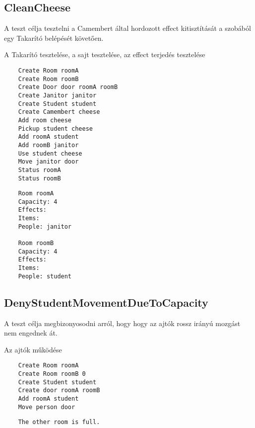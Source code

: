 \subsection{CleanCheese}
\begin{test-case-description}
    A teszt célja tesztelni a Camembert által hordozott effect kitisztítását a szobából egy Takarító belépését követően.
\end{test-case-description}
\begin{test-case-function}
    A Takarító tesztelése, a sajt tesztelése, az effect terjedés tesztelése
\end{test-case-function}
\begin{test-case-input}
    \begin{verbatim}
    Create Room roomA
    Create Room roomB
    Create Door door roomA roomB
    Create Janitor janitor
    Create Student student
    Create Camembert cheese
    Add room cheese
    Pickup student cheese
    Add roomA student
    Add roomB janitor
    Use student cheese
    Move janitor door
    Status roomA
    Status roomB
    \end{verbatim}
\end{test-case-input}
\begin{test-case-output}
    \begin{verbatim}
    Room roomA
    Capacity: 4
    Effects:
    Items:
    People: janitor

    Room roomB
    Capacity: 4
    Effects: 
    Items:
    People: student
    \end{verbatim}
\end{test-case-output}

\subsection{DenyStudentMovementDueToCapacity}
\begin{test-case-description}
    A teszt célja megbizonyosodni arról, hogy hogy az ajtók rossz irányú mozgást nem
engednek át.
\end{test-case-description}
\begin{test-case-function}
    Az ajtók működése
\end{test-case-function}
\begin{test-case-input}
    \begin{verbatim}
    Create Room roomA
    Create Room roomB 0
    Create Student student
    Create door roomA roomB
    Add roomA student
    Move person door
    \end{verbatim}
\end{test-case-input}
\begin{test-case-output}
    \begin{verbatim}
    The other room is full.
    \end{verbatim}
\end{test-case-output}

